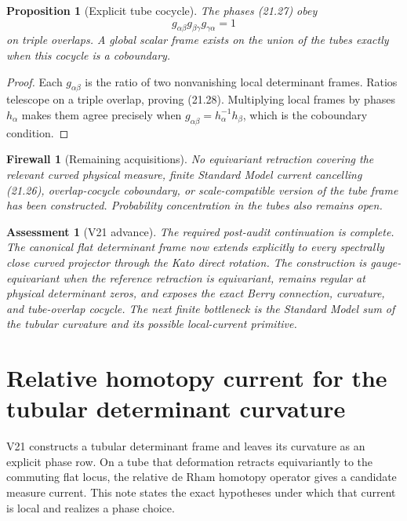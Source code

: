 \documentclass[11pt]{article}
\newtheorem{proposition}[theorem]{Proposition}
\newtheorem{assessment}[theorem]{Assessment}
\newtheorem{firewall}[theorem]{Firewall}
\begin{document}
\begin{proposition}[Explicit tube cocycle]
\label{prop:v11v21-cocycle}
The phases (21.27) obey
\[
 g_{\alpha\beta}g_{\beta\gamma}g_{\gamma\alpha}=1
 \tag{21.28}
\]
on triple overlaps.  A global scalar frame exists on the union of the
tubes exactly when this cocycle is a coboundary.
\end{proposition}

\begin{proof}
Each \(g_{\alpha\beta}\) is the ratio of two nonvanishing local
determinant frames.  Ratios telescope on a triple overlap, proving
(21.28).  Multiplying local frames by phases \(h_\alpha\) makes them
agree precisely when
\(g_{\alpha\beta}=h_\alpha^{-1}h_\beta\), which is the coboundary
condition.
\end{proof}

\begin{firewall}[Remaining acquisitions]
\label{fw:v11v21-remaining}
No equivariant retraction covering the relevant curved physical measure,
finite Standard Model current cancelling (21.26), overlap-cocycle
coboundary, or scale-compatible version of the tube frame has been
constructed.  Probability concentration in the tubes also remains open.
\end{firewall}

\begin{assessment}[V21 advance]
\label{ass:v11v21}
The required post-audit continuation is complete.  The canonical flat
determinant frame now extends explicitly to every spectrally close curved
projector through the Kato direct rotation.  The construction is
gauge-equivariant when the reference retraction is equivariant, remains
regular at physical determinant zeros, and exposes the exact Berry
connection, curvature, and tube-overlap cocycle.  The next finite
bottleneck is the Standard Model sum of the tubular curvature and its
possible local-current primitive.
\end{assessment}


\section{Relative homotopy current for the tubular determinant curvature}
\label{sec:v11v22}

V21 constructs a tubular determinant frame and leaves its curvature as an
explicit phase row.  On a tube that deformation retracts equivariantly to
the commuting flat locus, the relative de Rham homotopy operator gives a
candidate measure current.  This note states the exact hypotheses under
which that current is local and realizes a phase choice.
\end{document}

